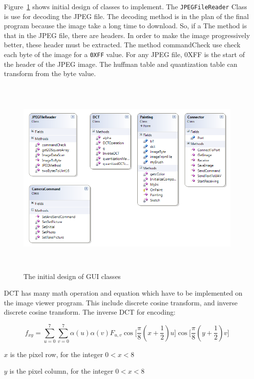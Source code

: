 Figure~\ref{ini_Class} shows initial design of classes to implement. The \texttt{JPEGFileReader} Class is use for decoding the JPEG file. The decoding method is in the plan of the final program because the image take a long time to download. So, if a  The method is that in the JPEG file, there are headers. In order to make the image progressively better, these header must be extracted. The method commandCheck use check each byte of the image for a \texttt{0XFF} value. For any JPEG file, 0XFF is the start of the header of the JPEG image. The huffman table and quantization table can transform from the byte value. 
\begin{center}
\begin{figure}[!hbtp]
\includegraphics[width=150mm,height=100mm]{figures/initialClassDiagram.png} 
\caption{The initial design of GUI classes\label{ini_Class}}
\end{figure}
\end{center}
DCT has many math operation and equation which have to be implemented on the image viewer program. This include discrete cosine transform, and inverse discrete cosine transform. The inverse DCT for encoding:

\begin{equation}
f_{xy}=\sum_{u=0}^7\sum_{v=0}^7 \alpha(u) \alpha(v) F_{u,v} \cos\Big[\dfrac{\pi}{8}(x+\dfrac{1}{2})u\Big]\cos\Big[\dfrac{\pi}{8}(y+\dfrac{1}{2})v\Big]
\end{equation}

$x$ is the pixel row, for the integer $0< x< 8$

$y$ is the pixel column, for the integer $0< x< 8$

